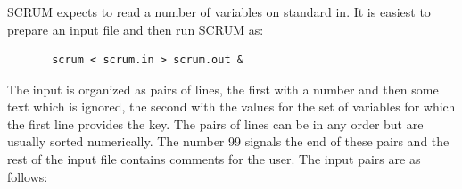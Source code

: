 \subsubsection{}
SCRUM expects to read a number of variables on standard in.  It is
easiest to prepare an input file and then run SCRUM as:
\begin{verbatim}
       scrum < scrum.in > scrum.out &
\end{verbatim}
The input is organized as pairs of lines, the first with a number and
then some text which is ignored, the second with the values for the
set of variables for which the first line provides the key.  The pairs
of lines can be in any order but are usually sorted numerically.  The
number 99 signals the end of these pairs and the rest of the input file
contains comments for the user.  The input pairs are as follows:
